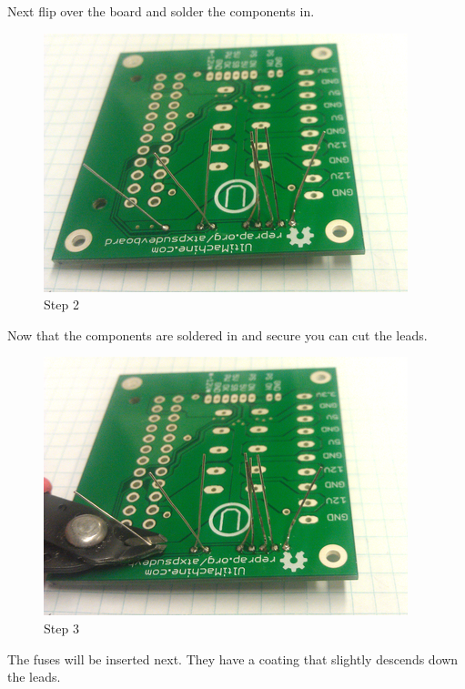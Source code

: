 Next flip over the board and solder the components in.

\begin{figure}[htbp]
\centering
\includegraphics{./png/step-02.png}
\caption{Step 2}
\end{figure}

Now that the components are soldered in and secure you can cut the
leads.

\begin{figure}[htbp]
\centering
\includegraphics{./png/step-03.png}
\caption{Step 3}
\end{figure}

The fuses will be inserted next. They have a coating that slightly
descends down the leads.

